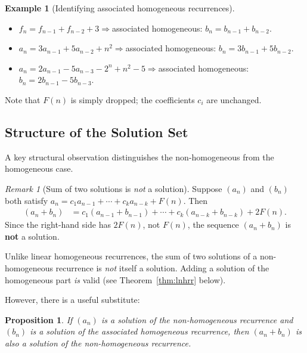 \documentclass[11pt, a4paper, notitlepage]{report}
\newtheorem{proposition}[theorem]{Proposition}
\theoremstyle{definition}
\newtheorem{example}[theorem]{Example}
\theoremstyle{remark}
\newtheorem{remark}[theorem]{Remark}
\begin{document}
\begin{example}[Identifying associated homogeneous recurrences]
\label{ex:lnhrr-identify}
\hfill
\begin{itemize}
  \item $f_n = f_{n-1} + f_{n-2} + 3$\quad $\Longrightarrow$\quad associated homogeneous: $b_n = b_{n-1} + b_{n-2}$.
  \item $a_n = 3a_{n-1} + 5a_{n-2} + n^2$\quad $\Longrightarrow$\quad associated homogeneous: $b_n = 3b_{n-1} + 5b_{n-2}$.
  \item $a_n = 2a_{n-1} - 5a_{n-3} - 2^n + n^2 - 5$\quad $\Longrightarrow$\quad associated homogeneous: $b_n = 2b_{n-1} - 5b_{n-3}$.
\end{itemize}
Note that $F(n)$ is simply dropped; the coefficients $c_i$ are unchanged.
\end{example}

\subsection{Structure of the Solution Set}
\label{subsec:lnhrr-structure}

A key structural observation distinguishes the non-homogeneous from the homogeneous case.

\begin{remark}[Sum of two solutions is \emph{not} a solution]
Suppose $(a_n)$ and $(b_n)$ both satisfy $a_n = c_1 a_{n-1} + \cdots + c_k a_{n-k} + F(n)$.
Then
\begin{align*}
  (a_n + b_n) &= c_1(a_{n-1}+b_{n-1}) + \cdots + c_k(a_{n-k}+b_{n-k}) + 2F(n).
\end{align*}
Since the right-hand side has $2F(n)$, not $F(n)$, the sequence $(a_n + b_n)$ is
\textbf{not} a solution.
\end{remark}

\begin{warning}[title={Warning: Non-Homogeneous Solutions Don't Add}]
  Unlike linear homogeneous recurrences, the sum of two solutions of a non-homogeneous
  recurrence is \emph{not} itself a solution.  Adding a solution of the homogeneous part
  \emph{is} valid (see Theorem~\ref{thm:lnhrr} below).
\end{warning}

However, there is a useful substitute:

\begin{proposition}
\label{prop:part-plus-hom}
If $(a_n)$ is a solution of the non-homogeneous recurrence and $(b_n)$ is a solution of
the \emph{associated homogeneous} recurrence, then $(a_n + b_n)$ is also a solution of the
non-homogeneous recurrence.
\end{proposition}
\end{document}
